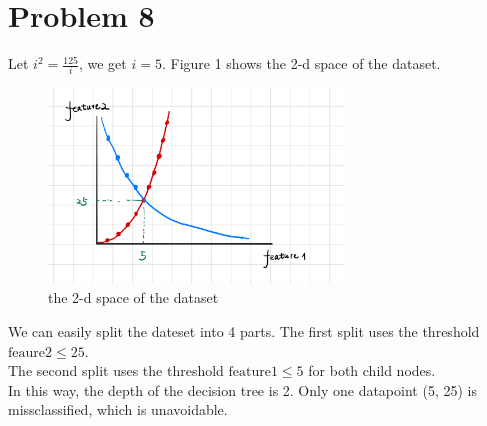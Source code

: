 \documentclass[12pt]{scrartcl}
\begin{document}
  \section*{Problem 8}
  Let \(i^2 = \frac{125}{i}\), we get \(i = 5\). Figure 1 shows the 2-d space of the
  dataset. 
  \begin{figure}[!htb] %
    \centering %
    \includegraphics[width=0.7\textwidth]{Problem8.png} %
    \caption{the 2-d space of the dataset} %
    \label{Fig.main2} %
  \end{figure}
  
  We can easily split the dateset into 4 parts.
  The first split uses the threshold \(\text{feaure2} \leqslant 25\). \\
  The second split uses the threshold \(\text{feature1} \leqslant 5\) for both child nodes. \\
  In this way, the depth of the decision tree is 2. Only one datapoint (5, 25) is missclassified,
  which is unavoidable.
\end{document}
